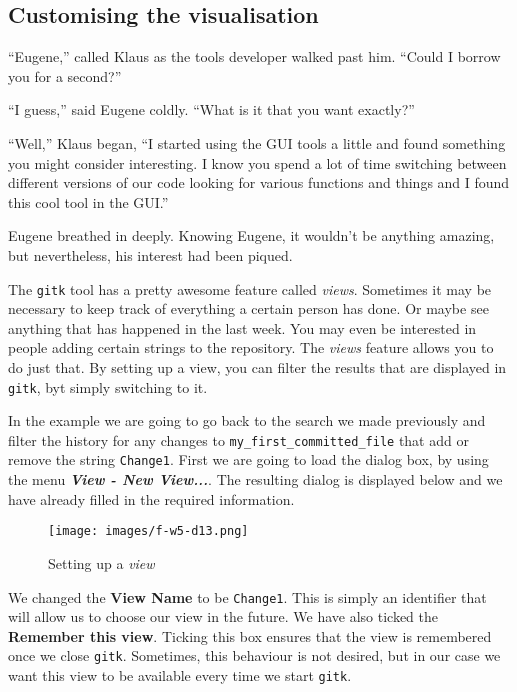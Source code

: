 \subsection{Customising the visualisation}

\begin{trenches}
``Eugene,'' called Klaus as the tools developer walked past him.  ``Could I borrow you for a second?''

``I guess,'' said Eugene coldly.  ``What is it that you want exactly?''

``Well,'' Klaus began, ``I started using the GUI tools a little and found something you might consider interesting.  I know you spend a lot of time switching between different versions of our code looking for various functions and things and I found this cool tool in the GUI.''

Eugene breathed in deeply.  Knowing Eugene, it wouldn't be anything amazing, but nevertheless, his interest had been piqued.
\end{trenches}

The \texttt{gitk} tool has a pretty awesome feature called \emph{views}.  Sometimes it may be necessary to keep track of everything a certain person has done.  Or maybe see anything that has happened in the last week.  You may even be interested in people adding certain strings to the repository.  The \emph{views} feature allows you to do just that.  By setting up a view, you can filter the results that are displayed in \texttt{gitk}, byt simply switching to it.  

In the example we are going to go back to the search we made previously and filter the history for any changes to \texttt{my\_first\_committed\_file} that add or remove the string \texttt{Change1}.  First we are going to load the dialog box, by using the menu \textbf{\emph{View - New View...}}.  The resulting dialog is displayed below and we have already filled in the required information.

\begin{figure}[hbt]
\centering
\texttt{[image: images/f-w5-d13.png]}
\caption{Setting up a \emph{view}}
\end{figure} 

We changed the \textbf{View Name} to be \texttt{Change1}.  This is simply an identifier that will allow us to choose our view in the future.  We have also ticked the \textbf{Remember this view}.  Ticking this box ensures that the view is remembered once we close \texttt{gitk}.  Sometimes, this behaviour is not desired, but in our case we want this view to be available every time we start \texttt{gitk}.

